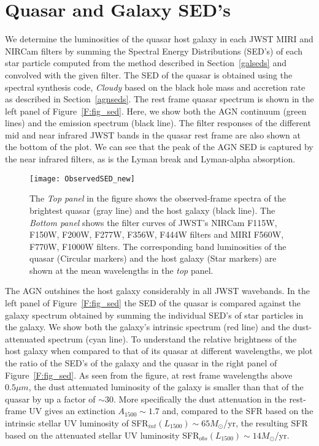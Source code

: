 \documentclass[twocolumn,useAMS,usenatbib]{mnras} \usepackage{natbib}
\newcommand{\Msun}{M_{\odot}}
\begin{document}
\section{Quasar and Galaxy SED's} \label{S:seds}


We determine the luminosities of the quasar host galaxy in each JWST MIRI and NIRCam filters by summing the Spectral Energy Distributions (SED's) of each star particle computed from the method described in Section~\ref{galseds}  and convolved with the given filter.
The SED of the quasar is obtained using the spectral synthesis code, {\em Cloudy} \citep{2013RMxAA..49..137F} based on the black hole mass and accretion rate as described in Section~\ref{agnseds}. 
The rest frame quasar spectrum is shown in the left panel of Figure~\ref{F:fig_sed}. Here, we show both the AGN continuum (green lines) and the emission spectrum (black line). The filter responses of the different mid and near infrared JWST bands in the quasar rest frame are also shown at the bottom of the plot. We can see that the peak of the AGN SED is captured by the near infrared filters, as is the Lyman break and Lyman-alpha absorption.

\begin{figure*}
\texttt{[image: ObservedSED\_new]}
\caption{\label{F:fig_sed_obs} The {\em Top panel} in the figure shows the observed-frame spectra of the brightest quasar (gray line) and the host galaxy (black line). The {\em Bottom panel} shows the filter curves of JWST's NIRCam F115W, F150W, F200W, F277W, F356W, F444W filters and MIRI F560W, F770W, F1000W filters. The corresponding band luminosities of the quasar (Circular markers) and the host galaxy (Star markers) are shown at the mean wavelengths in the {\em top} panel.}  
\end{figure*}


The AGN outshines the host galaxy considerably in all JWST wavebands. In the left panel of Figure~\ref{F:fig_sed} the SED of the quasar is compared against the galaxy spectrum obtained by summing the individual SED's of star particles in the galaxy. 
We show both the galaxy's intrinsic spectrum (red line) and the dust-attenuated spectrum (cyan line). 
To understand the relative brightness of the host galaxy when compared to that of its quasar at different wavelengths, we plot the ratio of the SED's of the galaxy and the quasar in the right panel of Figure~\ref{F:fig_sed}. 
As seen from the figure, at rest frame wavelengths above $0.5 \mu m$, the  dust attenuated luminosity of the galaxy is smaller than that of the quasar by up a factor of $\sim 30$. More specifically
the dust attenuation in the rest-frame UV gives an extinction $A_{1500} \sim 1.7$
and, compared to the SFR based on the intrinsic stellar UV luminosity
of  SFR$_{int}(L_ {1500}) \sim 65 \Msun$/yr, the resulting 
SFR based on the attenuated stellar UV luminosity SFR$_{obs}(L_{1500}) \sim 14 \Msun$/yr.
\end{document}
